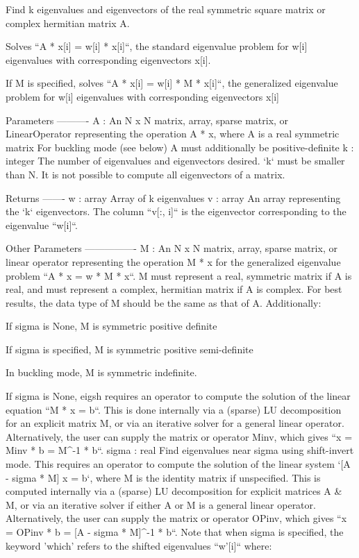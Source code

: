 \begin{DoxyVerb}Find k eigenvalues and eigenvectors of the real symmetric square matrix
or complex hermitian matrix A.

Solves ``A * x[i] = w[i] * x[i]``, the standard eigenvalue problem for
w[i] eigenvalues with corresponding eigenvectors x[i].

If M is specified, solves ``A * x[i] = w[i] * M * x[i]``, the
generalized eigenvalue problem for w[i] eigenvalues
with corresponding eigenvectors x[i]

Parameters
----------
A : An N x N matrix, array, sparse matrix, or LinearOperator representing
    the operation A * x, where A is a real symmetric matrix
    For buckling mode (see below) A must additionally be positive-definite
k : integer
    The number of eigenvalues and eigenvectors desired.
    `k` must be smaller than N. It is not possible to compute all
    eigenvectors of a matrix.

Returns
-------
w : array
    Array of k eigenvalues
v : array
    An array representing the `k` eigenvectors.  The column ``v[:, i]`` is
    the eigenvector corresponding to the eigenvalue ``w[i]``.

Other Parameters
----------------
M : An N x N matrix, array, sparse matrix, or linear operator representing
    the operation M * x for the generalized eigenvalue problem
      ``A * x = w * M * x``.
    M must represent a real, symmetric matrix if A is real, and must
    represent a complex, hermitian matrix if A is complex. For best
    results, the data type of M should be the same as that of A.
    Additionally:

        If sigma is None, M is symmetric positive definite

        If sigma is specified, M is symmetric positive semi-definite

        In buckling mode, M is symmetric indefinite.

    If sigma is None, eigsh requires an operator to compute the solution
    of the linear equation ``M * x = b``. This is done internally via a
    (sparse) LU decomposition for an explicit matrix M, or via an
    iterative solver for a general linear operator.  Alternatively,
    the user can supply the matrix or operator Minv, which gives
    ``x = Minv * b = M^-1 * b``.
sigma : real
    Find eigenvalues near sigma using shift-invert mode.  This requires
    an operator to compute the solution of the linear system
    `[A - sigma * M] x = b`, where M is the identity matrix if
    unspecified.  This is computed internally via a (sparse) LU
    decomposition for explicit matrices A & M, or via an iterative
    solver if either A or M is a general linear operator.
    Alternatively, the user can supply the matrix or operator OPinv,
    which gives ``x = OPinv * b = [A - sigma * M]^-1 * b``.
    Note that when sigma is specified, the keyword 'which' refers to
    the shifted eigenvalues ``w'[i]`` where:


\end{DoxyVerb}
